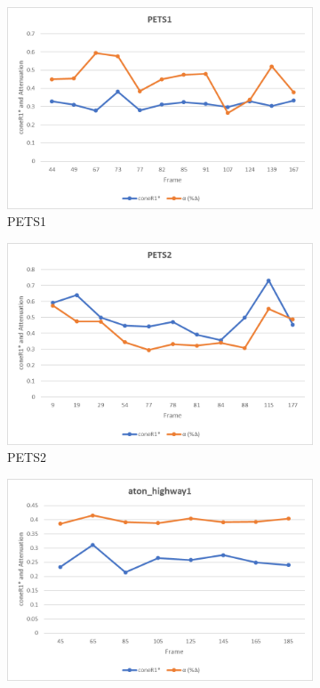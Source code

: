 \begin{appendices}
\clearpage
\FloatBarrier
\begin{figure}
  \begin{subfigure}{.45\linewidth}
  \includegraphics[width=1\linewidth]{figures/appendix/pets1_rgb.jpg}
  \caption{PETS1}
\end{subfigure}
\hfill
\begin{subfigure}{.45\linewidth}
  \includegraphics[width=1\linewidth]{figures/appendix/pets2_rgb.jpg}
  \caption{PETS2}
\end{subfigure}
\hfill
\begin{subfigure}{.45\linewidth}
  \includegraphics[width=1\linewidth]{figures/appendix/highway1_rgb.jpg}

\end{subfigure}
\end{figure}
\end{appendices}
